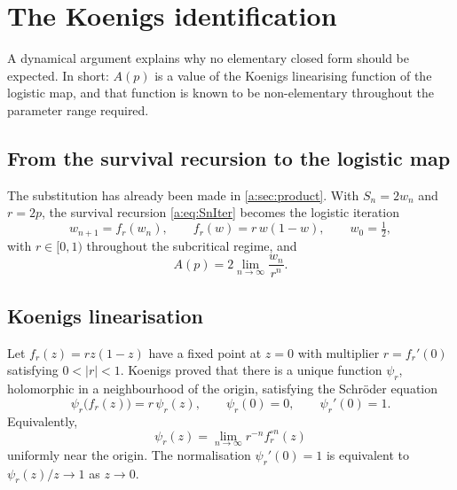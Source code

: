 \section{The Koenigs identification}
\label{a:sec:koenigs}

A dynamical argument explains why no elementary closed form should be expected. In
short: $A(p)$ is a value of the Koenigs linearising function of the logistic map,
and that function is known to be non-elementary throughout the parameter range
required.

\subsection{From the survival recursion to the logistic map}
\label{a:sec:tologistic}

The substitution has already been made in \cref{a:sec:product}. With $S_n = 2w_n$
and $r = 2p$, the survival recursion \cref{a:eq:SnIter} becomes the logistic
iteration
\begin{equation}
\label{a:eq:logisticagain}
w_{n+1} = f_r(w_n),
\qquad
f_r(w) = r\,w(1-w),
\qquad
w_0 = \tfrac12,
\end{equation}
with $r\in[0,1)$ throughout the subcritical regime, and
\begin{equation}
\label{a:eq:Afromw}
A(p) = 2\lim_{n\to\infty}\frac{w_n}{r^n} .
\end{equation}

\subsection{Koenigs linearisation}
\label{a:sec:koenigsdef}

\begin{definition}
\label{a:def:koenigs}
Let $f_r(z) = rz(1-z)$ have a fixed point at $z=0$ with multiplier
$r = f_r'(0)$ satisfying $0<|r|<1$. Koenigs \cite{Koenigs1884} proved that there
is a unique function $\psi_r$, holomorphic in a neighbourhood of the origin,
satisfying the Schröder equation
\begin{equation}
\label{a:eq:schroder}
\psi_r\bigl(f_r(z)\bigr) = r\,\psi_r(z),
\qquad
\psi_r(0)=0,
\qquad
\psi_r'(0)=1 .
\end{equation}
Equivalently,
\begin{equation}
\label{a:eq:koenigslimit}
\psi_r(z) = \lim_{n\to\infty}r^{-n}f_r^{\circ n}(z)
\end{equation}
uniformly near the origin. The normalisation $\psi_r'(0)=1$ is equivalent to
$\psi_r(z)/z\to1$ as $z\to0$.
\end{definition}

